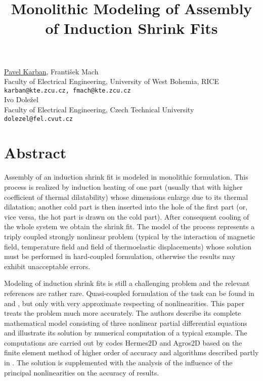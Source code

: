 \title{Monolithic Modeling of Assembly of Induction Shrink Fits}
\author{} \institute{}
\maketitle

\begin{center}
{\large \underline{Pavel Karban}, Franti\v{s}ek Mach}\\
Faculty of Electrical Engineering, University of West Bohemia, RICE\\
{\tt karban@kte.zcu.cz, fmach@kte.zcu.cz}\\
\vspace{4mm}
{\large Ivo Dole\v{z}el}\\
Faculty of Electrical Engineering, Czech Technical University\\
{\tt dolezel@fel.cvut.cz}
\end{center}

\section*{Abstract}
Assembly of an induction shrink fit is modeled in monolithic formulation. This process is realized by induction heating of one part (usually that with higher coefficient of thermal dilatability) whose dimensions enlarge due to its thermal dilatation; another cold part is then inserted into the hole of the first part (or, vice versa, the hot part is drawn on the cold part). After consequent cooling of the whole system we obtain the shrink fit. The model of the process represents a triply coupled strongly nonlinear problem (typical by the interaction of magnetic field, temperature field and field of thermoelastic displacements) whose solution must be performed in hard-coupled formulation, otherwise the results may exhibit unacceptable errors.

Modeling of induction shrink fits is still a challenging problem and the relevant references are rather rare. Quasi-coupled formulation of the task can be found in \cite{Skopek} and \cite{Ukraine}, but only with very approximate respecting of nonlinearities. This paper treats the problem much more accurately. The authors describe its complete mathematical model consisting of three nonlinear partial differential equations and illustrate its solution by numerical computation of a typical example. The computations are carried out by codes Hermes2D and Agros2D \cite{Hermes2D} based on the finite element method of higher order of accuracy and algorithms described partly in \cite{Solin}. The solution is supplemented with the analysis of the influence of the principal nonlinearities on the accuracy of results.

